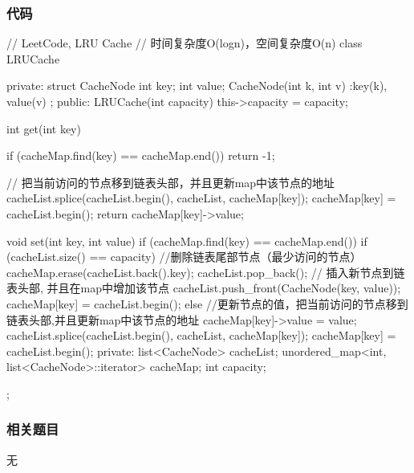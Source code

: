 \subsubsection{代码}
\begin{Code}
// LeetCode, LRU Cache
// 时间复杂度O(logn)，空间复杂度O(n)
class LRUCache{
private:
    struct CacheNode {
        int key;
        int value;
        CacheNode(int k, int v) :key(k), value(v){}
    };
public:
    LRUCache(int capacity) {
        this->capacity = capacity;
    }

    int get(int key) {
        if (cacheMap.find(key) == cacheMap.end()) return -1;
        
        // 把当前访问的节点移到链表头部，并且更新map中该节点的地址
        cacheList.splice(cacheList.begin(), cacheList, cacheMap[key]); 
        cacheMap[key] = cacheList.begin();
        return cacheMap[key]->value;
    }

    void set(int key, int value) {
        if (cacheMap.find(key) == cacheMap.end()) {
            if (cacheList.size() == capacity) { //删除链表尾部节点（最少访问的节点）
                cacheMap.erase(cacheList.back().key);
                cacheList.pop_back();
            }
            // 插入新节点到链表头部, 并且在map中增加该节点
            cacheList.push_front(CacheNode(key, value));
            cacheMap[key] = cacheList.begin();
        } else {
            //更新节点的值，把当前访问的节点移到链表头部,并且更新map中该节点的地址
            cacheMap[key]->value = value;
            cacheList.splice(cacheList.begin(), cacheList, cacheMap[key]);
            cacheMap[key] = cacheList.begin();
        }
    }
private:
    list<CacheNode> cacheList;
    unordered_map<int, list<CacheNode>::iterator> cacheMap;
    int capacity;
};
\end{Code}


\subsubsection{相关题目}
\begindot
\item 无
\myenddot

